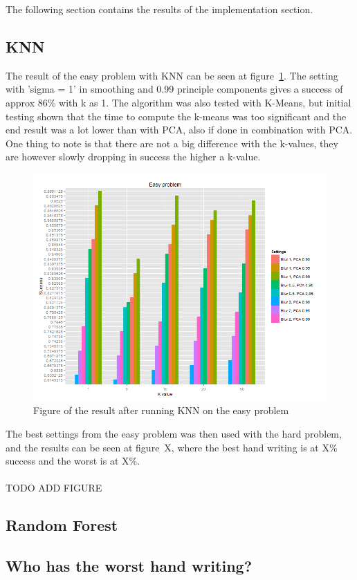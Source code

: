 \documentclass[report]{subfiles}
\begin{document}
The following section contains the results of the implementation section.

\subsection{KNN}
The result of the easy problem with KNN can be seen at figure~\ref{fig:knnEasyProblem}. The setting with 'sigma = 1' in smoothing and 0.99 principle components gives a success of approx 86\% with k as 1. The algorithm was also tested with K-Means, but initial testing shown that the time to compute the k-means was too significant and the end result was a lot lower than with PCA, also if done in combination with PCA.\\
One thing to note is that there are not a big difference with the k-values, they are however slowly dropping in success the higher a k-value.

\begin{figure}[H]
	\centering
	\includegraphics[width=1\textwidth]{images/knnEasyProblem}
	\caption{Figure of the result after running KNN on the easy problem}
	\label{fig:knnEasyProblem}
\end{figure}

The best settings from the easy problem was then used with the hard problem, and the results can be seen at figure~X, where the best hand writing is at X\% success and the worst is at X\%.\\
\\TODO ADD FIGURE

\subsection{Random Forest}

\subsection{Who has the worst hand writing?}
\end{document}
